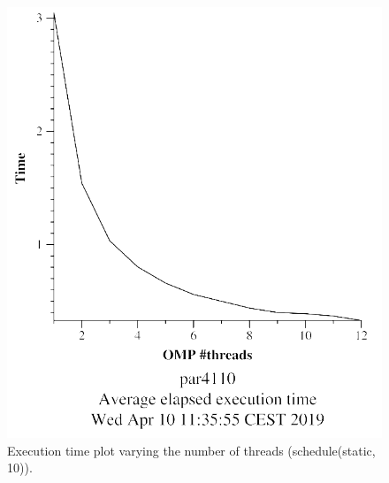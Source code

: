 \documentclass[12pt, a4paper]{article}
\begin{document}
\begin{figure}[H]
\centering
\begin{minipage}[b]{0.4\linewidth}
  \centering
  \includegraphics[scale=0.5]{./mandel-omp-10000-strong-omp-for-static-800-time}
  \caption{Execution time plot varying the number of threads (schedule(static, 10)).}
  \label{fig:mandel-omp-10000-strong-omp-for-static-800-time}
\end{minipage}%
\hspace{0.5cm}
\begin{minipage}[b]{0.4\linewidth}
  \centering

\end{minipage}
\end{figure}
\end{document}
